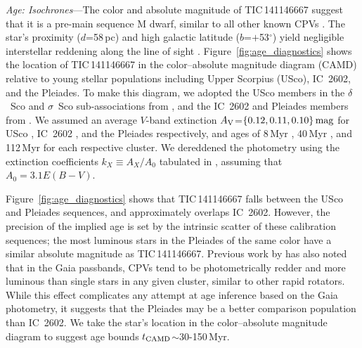 \documentclass[11pt,twocolumn,tighten,linenumbers]{aastex7}
\begin{document}
{\it Age: Isochrones}---The color and absolute magnitude of
TIC\,141146667 suggest that it is a pre-main sequence M dwarf, similar
to all other known CPVs \citep{Stauffer2017,Stauffer2021,Bouma2024}.
The star's proximity ($d$=58\,pc) and high galactic latitude
($b$=$+$53$^\circ$) yield negligible interstellar reddening along the
line of sight \citep{Green2019}.  Figure~\ref{fig:age_diagnostics}
shows the location of TIC\,141146667 in the color--absolute magnitude
diagram (CAMD) relative to young stellar populations including Upper
Scorpius (USco), IC~2602, and the Pleiades.  To make this diagram, we
adopted the USco members in the $\delta$~Sco and $\sigma$~Sco
sub-associations from \citet{Ratzenbock2023}, and the IC~2602 and
Pleiades members from \citet{Hunt2024}.  We assumed an average $V$-band
extinction $A_{\rm V}$=$\{0.12, 0.11, 0.10\}\,{\rm mag}$ for USco
\citep{Pecaut2016}, IC~2602 \citep{Hunt2024}, and the Pleiades
\citep{Hunt2024} respectively, and ages of 8\,Myr
\citep{Ratzenbock2023}, 40\,Myr \citep{Randich2018}, and 112\,Myr
\citep{Dahm2015} for each respective cluster.  We dereddened the
photometry using the extinction coefficients $k_X\equiv A_X/A_0$
tabulated in \citep{GaiaCollaboration2018}, assuming that $A_0 = 3.1
E(B-V)$.

Figure~\ref{fig:age_diagnostics} shows that TIC\,141146667 falls
between the USco and Pleiades sequences, and approximately overlaps
IC~2602.  However, the precision of the implied age is set by the
intrinsic scatter of these calibration sequences; the most luminous
stars in the Pleiades of the same color have a similar absolute
magnitude as TIC\,141146667.  Previous work by \citet{Stauffer2021} has
also noted that in the Gaia passbands, CPVs tend to be photometrically
redder and more luminous than single stars in any given cluster,
similar to other rapid rotators.  While this effect complicates any
attempt at age inference based on the Gaia photometry, it suggests
that the Pleiades may be a better comparison population than IC~2602.
We take the star's location in the color--absolute magnitude diagram
to suggest age bounds $t_{\rm CAMD}$$\sim$30-150\,Myr.
\end{document}
